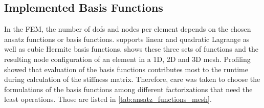 \subsection{Implemented Basis Functions}

In the FEM, the number of dofs and nodes per element depends on the chosen ansatz functions or basis functions. \Opendihu{} supports linear and quadratic Lagrange as well as cubic Hermite basis functions. 
 shows these three sets of functions and the resulting node configuration of an element in a 1D, 2D and 3D mesh.
Profiling showed that evaluation of the basis functions contributes most to the runtime during calculation of the stiffness matrix. Therefore, care was taken to choose the formulations of the basis functions among different factorizations that need the least operations. Those are listed in \cref{tab:ansatz_functions_mesh}.

